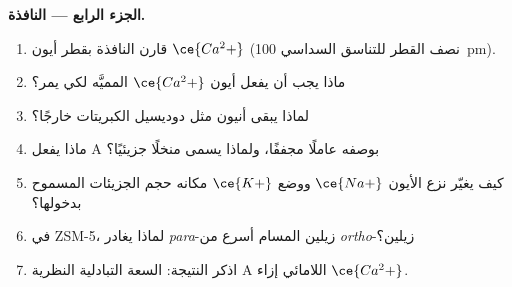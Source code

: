 \begin{problem}
\medskip\noindent\textbf{الجزء الرابع --- النافذة.}
\begin{enumerate}[resume]
  \item قارن النافذة بقطر أيون $\ce{Ca^2+}$ (نصف القطر للتناسق السداسي
        \qty{100}{pm}).
  \item ماذا يجب أن يفعل أيون $\ce{Ca^2+}$ المميَّه لكي يمر؟
  \item لماذا يبقى أنيون  مثل دوديسيل الكبريتات خارجًا؟
  \item ماذا يفعل  A بوصفه عاملًا مجففًا، ولماذا يسمى
        منخلًا جزيئيًا؟
  \item كيف يغيّر نزع الأيون $\ce{Na+}$ ووضع $\ce{K+}$ مكانه حجم الجزيئات المسموح بدخولها؟
  \item في ZSM-5، لماذا يغادر \textit{para}-زيلين المسام أسرع من \textit{ortho}-زيلين؟
  \item اذكر النتيجة: السعة التبادلية النظرية  A اللامائي
        إزاء $\ce{Ca^2+}$.
\end{enumerate}
\end{problem}
